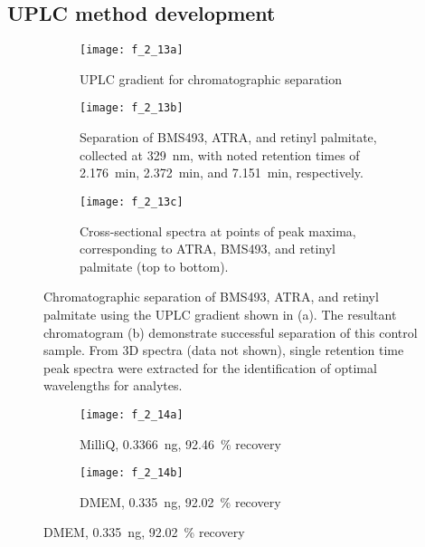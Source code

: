 \begin{refsection}
\section{UPLC method development}
\label{sec:rp_method}
\begin{figure} \centering \begin{subfigure}[b]{0.7\textwidth}
        \texttt{[image: f\_2\_13a]} \caption{UPLC gradient for
        chromatographic separation} \label{fig:uplc_gradient} \end{subfigure}
    \begin{subfigure}[b]{0.7\textwidth}
        \texttt{[image: f\_2\_13b]} \caption{Separation of BMS493, ATRA, and retinyl palmitate, collected at
            \SI{329}{\nm}, with noted retention times of \SI{2.176}{\minute},
            \SI{2.372}{\minute}, and \SI{7.151}{\minute}, respectively.}
        \label{fig:std_chromatogram} \end{subfigure}
    \begin{subfigure}[b]{0.7\textwidth}
        \texttt{[image: f\_2\_13c]} \caption{Cross-sectional
            spectra
            at points of peak maxima, corresponding to ATRA, BMS493, and retinyl
        palmitate (top to bottom).}
        \label{fig:retinoid_spectra} \end{subfigure}
    \caption[Chromatographic separation of BMS493, ATRA, and retinyl
    palmitate]{Chromatographic separation of BMS493, ATRA, and retinyl palmitate
        using the UPLC gradient shown in (a). The resultant chromatogram (b)
        demonstrate successful separation of this control sample. From 3D
        spectra (data not shown), single retention time peak spectra were
    extracted for the identification of optimal wavelengths for
analytes.}\label{fig:uplc_report} \end{figure}
\begin{figure}
    \centering
    \begin{subfigure}[b]{0.75\textwidth}
        \texttt{[image: f\_2\_14a]}
        \caption{MilliQ, \SI{0.3366}{\ng}, \SI{92.46}{\percent} recovery}
        \label{fig:milliq_extract}
    \end{subfigure}
    \begin{subfigure}[b]{0.8\textwidth}
        \texttt{[image: f\_2\_14b]}
        \caption{DMEM, \SI{0.335}{\ng}, \SI{92.02}{\percent} recovery}
        \label{fig:lonza_extract}

\end{subfigure}
\end{figure}
\end{refsection}
